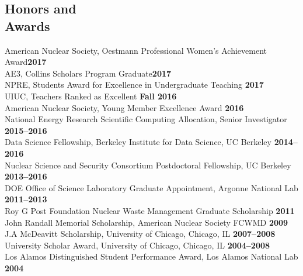 \documentclass[margin,line]{resume}
\begin{document}
\begin{resume}
    \section{\mysidestyle Honors and\\Awards}
                American Nuclear Society, Oestmann Professional Women's Achievement Award\hfill \textbf{2017}\vspace{.5mm}\\%
                AE3, Collins Scholars Program Graduate\hfill \textbf{2017}\vspace{.5mm}\\%
                NPRE, Students Award for Excellence in Undergraduate Teaching \hfill \textbf{2017}\vspace{.5mm}\\%
                UIUC, Teachers Ranked as Excellent \hfill \textbf{Fall 2016}\vspace{.5mm}\\%
                American Nuclear Society, Young Member Excellence Award                         \hfill \textbf{2016}\vspace{.5mm}\\%
                National Energy Research Scientific Computing Allocation, Senior Investigator     \hfill \textbf{2015--2016}\vspace{.5mm}\\%
                Data Science Fellowship, Berkeley Institute for Data Science, UC Berkeley     \hfill \textbf{2014--2016}\vspace{.5mm}\\%
                Nuclear Science and Security Consortium Postdoctoral Fellowship, UC Berkeley  \hfill \textbf{2013--2016}\vspace{.5mm}\\%
		DOE Office of Science Laboratory Graduate Appointment, Argonne National Lab   \hfill \textbf{2011--2013}\vspace{.5mm}\\%
		Roy G  Post Foundation Nuclear Waste Management Graduate Scholarship                \hfill \textbf{2011}\vspace{.5mm}\\%
		John Randall Memorial Scholarship, American Nuclear Society FCWMD                   \hfill \textbf{2009}\vspace{.5mm}\\%
		J.A  McDeavitt Scholarship, University of Chicago, Chicago, IL                 \hfill\textbf{2007--2008}\vspace{.5mm}\\%
		University Scholar Award, University of Chicago, Chicago, IL                   \hfill\textbf{2004--2008}\vspace{.5mm}\\%
		Los Alamos Distinguished Student Performance Award, Los Alamos National Lab                         \hfill\textbf{2004}%

\end{resume}
\end{document}
